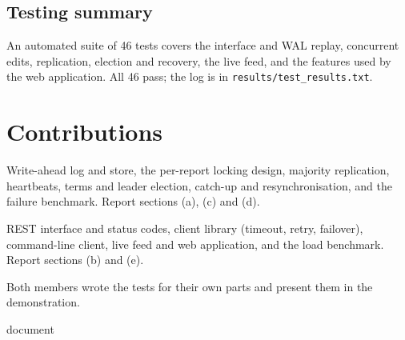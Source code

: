 \documentclass[10pt,a4paper]{article}
\newcommand{\code}[1]{\texttt{#1}}
\newcommand{\memberA}{Woduwa Marvin Wamoni}
\newcommand{\memberB}{Nyomore Henry}
\begin{document}
\subsection{Testing summary}

An automated suite of 46 tests covers the interface and WAL replay, concurrent edits,
replication, election and recovery, the live feed, and the features used by the web application.
All 46 pass; the log is in \code{results/test\_results.txt}.

\section{Contributions}

\begin{description}[leftmargin=0cm,style=nextline]
\item[\memberA\ (cluster side)] Write-ahead log and store, the per-report locking design,
majority replication, heartbeats, terms and leader election, catch-up and resynchronisation, and
the failure benchmark. Report sections (a), (c) and (d).
\item[\memberB\ (client and interface side)] REST interface and status codes, client library
(timeout, retry, failover), command-line client, live feed and web application, and the load
benchmark. Report sections (b) and (e).
\end{description}
Both members wrote the tests for their own parts and present them in the demonstration.

{document}
\end{document}
